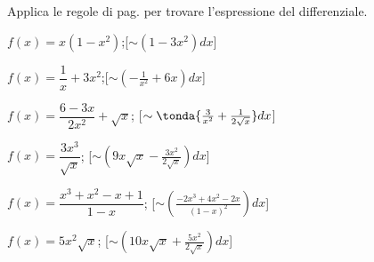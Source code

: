 \begin{esercizio}\label{ese:dif07}
Applica le regole di pag.\pageref{subsubsec:diff01_diffsint} per trovare 
l'espressione del differenziale.
 \begin{enumeratea}
  \item \(f(x)=x(1-x^2)\);\hfill [\(\sim (1-3x^2)dx\)]
  \item \(f(x)=\dfrac{1}{x}+ 3x^2\);\hfill [\(\sim (-\frac{1}{x^2}+6x)dx\)]
  \item \(f(x)=\dfrac{6-3x}{2x^2}+\sqrt{x}\);\hfill 
  [\(\sim \tonda{\frac{3}{x^2}+\frac{1}{2\sqrt{x}}}dx\)]
  \item \(f(x)=\dfrac{3x^3}{\sqrt{x}}\);\hfill 
  [\(\sim (9x\sqrt{x}-\frac{3x^2}{2\sqrt{x}})dx\)]
  \item \(f(x)=\dfrac{x^3+x^2-x+1}{1-x}\);\hfill 
  [\(\sim (\frac{-2x^3+4x^2-2x}{(1-x)^2})dx\)]
  \item \(f(x)=5x^2\sqrt{x}\);\hfill 
  [\(\sim (10x\sqrt{x}+\frac{5x^2}{2\sqrt{x}})dx\)]
 \end{enumeratea}
\end{esercizio} 



